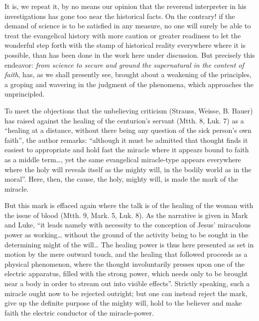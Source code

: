 \documentclass[12pt,a4paper,openany]{book}
\newcommand{\opage}[1]{\marginnote{\footnotesize\textit{[#1]}}}
\begin{document}
It is, we repeat it, by no means our opinion that
the reverend interpreter in his investigations has gone
too near the historical facts. On the contrary! if
the demand of science is to be satisfied in any measure,   %
no one will surely be able to treat the evangelical
history with more caution or greater readiness
to let the wonderful step forth with the stamp of historical reality
everywhere where it is possible,
than has been done in the work here under discussion. But precisely
this endeavor: \emph{from science to secure
and ground the supernatural in the content of faith},
has, as we shall presently see, brought about a weakening
of the principles, a groping and wavering in the judgment
of the phenomena, which approaches the
unprincipled.

To meet the objections that the unbelieving criticism
(Strauss, Weisse, B. Bauer) has raised against the healing
of the centurion's servant (Mtth. 8, Luk. 7) as a
``healing at a distance, without there being any question of the
\setcounter{footnote}{0}%
\opage{304}sick person's own faith'', the author remarks: ``although it
must be admitted that thought finds it easiest to appropriate
and hold fast the miracle where it appears bound
to faith as a middle term\dots{}, yet the
same evangelical miracle-type appears everywhere where the holy
will reveals itself as the mighty will, in the
bodily world as in the moral''. Here, then, the cause,
the holy, mighty will, is made the mark of the miracle.

But this mark is effaced again where the talk
is of the healing of the woman with the issue of blood (Mtth. 9,
Mark. 5, Luk. 8). As the narrative is given
in Mark and Luke, ``it leads namely with necessity
to the conception of Jesus' miraculous power
as working\dots{} without the ground of the activity being
to be sought in the determining might of the will\dots{} The healing
power is thus here presented as set in motion
by the mere outward touch, and the healing that followed
proceeds as a physical phenomenon,
where the thought involuntarily presses upon one of the electric
apparatus, filled with the strong power, which needs only
to be brought near a body in order to stream
out into visible effects''. Strictly speaking, such a
miracle ought now to be rejected outright; but one can instead
reject the mark, give up the definite purpose of the
mighty will, hold to the believer and
make faith the electric conductor of the miracle-power.
\end{document}
